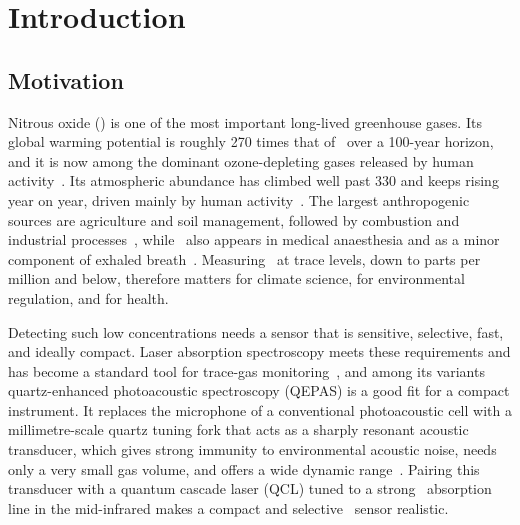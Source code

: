 \chapter{Introduction}
\label{ch:introduction}

\section{Motivation}
\label{sec:motivation}

Nitrous oxide (\nto) is one of the most important long-lived greenhouse gases. Its global warming potential is roughly \num{270} times that of \cotwo\ over a 100-year horizon, and it is now among the dominant ozone-depleting gases released by human activity~. Its atmospheric abundance has climbed well past \SI{330}{\ppb} and keeps rising year on year, driven mainly by human activity~. The largest anthropogenic sources are agriculture and soil management, followed by combustion and industrial processes~, while \nto\ also appears in medical anaesthesia and as a minor component of exhaled breath~. Measuring \nto\ at trace levels, down to parts per million and below, therefore matters for climate science, for environmental regulation, and for health.

Detecting such low concentrations needs a sensor that is sensitive, selective, fast, and ideally compact. Laser absorption spectroscopy meets these requirements and has become a standard tool for trace-gas monitoring~, and among its variants quartz-enhanced photoacoustic spectroscopy (QEPAS) is a good fit for a compact instrument. It replaces the microphone of a conventional photoacoustic cell with a millimetre-scale quartz tuning fork that acts as a sharply resonant acoustic transducer, which gives strong immunity to environmental acoustic noise, needs only a very small gas volume, and offers a wide dynamic range~\cite{kosterev2002, patimisco2014}. Pairing this transducer with a quantum cascade laser (QCL) tuned to a strong \nto\ absorption line in the mid-infrared makes a compact and selective \nto\ sensor realistic.

